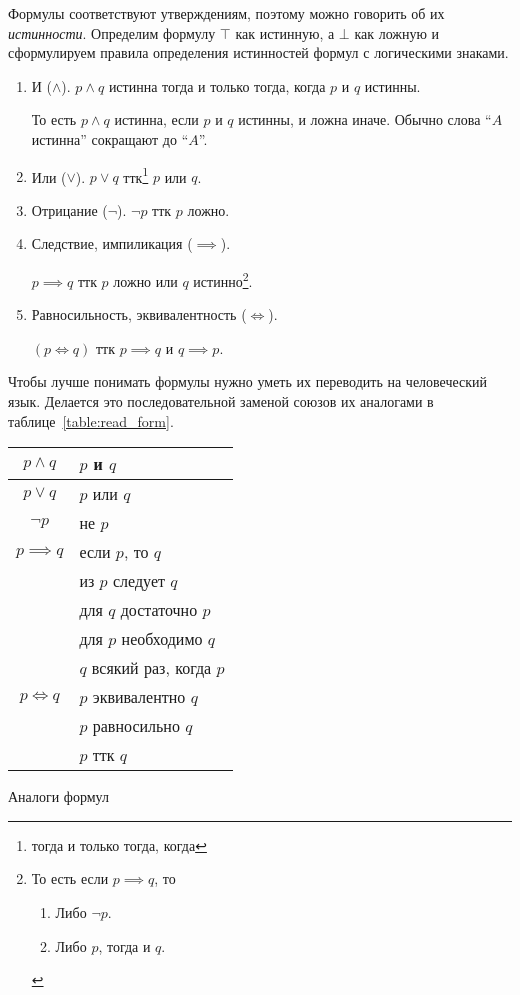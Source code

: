Формулы соответствуют утверждениям, поэтому можно говорить об их {\it истинности}.
Определим формулу $\top$ как истинную, а $\bot$ как ложную и
сформулируем правила определения истинностей формул с логическими знаками.
\begin{enumerate}
	\item{}И ($\land$). $p\land q$ истинна тогда и только тогда, когда $p$ и $q$ истинны.

	То есть $p\land q$ истинна, если $p$ и $q$ истинны,
	и ложна иначе. Обычно слова ``$A$ истинна'' сокращают до ``$A$''.

	\item{}Или ($\lor$). $p\lor q$ ттк\footnote{тогда и только тогда, когда} $p$ или $q$.

	\item{}Отрицание ($\lnot$). $\lnot p$ ттк $p$ ложно.

	\item{}Следствие, импиликация ($\implies$).

	$p\implies q$ ттк $p$ ложно или $q$ истинно\footnote{
		То есть если $p\implies q$, то
		\begin{enumerate}
			\item{}Либо $\lnot p$.
			\item{}Либо $p$, тогда и $q$.
		\end{enumerate}
	}.

	\item{}Равносильность, эквивалентность ($\iff$).

	$(p\iff q)$ ттк $p\implies q$ и $q\implies p$.
\end{enumerate}

Чтобы лучше понимать формулы нужно уметь их переводить на человеческий язык. Делается
это последовательной заменой союзов их аналогами в таблице~\ref{table:read_form}.
\begin{margintable}
	\begin{tabular}{cl}
		$p\land q$    & $p$ и $q$                 \\\hline
		$p\lor q$     & $p$ или $q$               \\\hline
		$\lnot p$     & не $p$                    \\\hline
		$p\implies q$ & если $p$, то $q$          \\
		              & из $p$ следует $q$        \\
		              & для $q$ достаточно $p$    \\
		              & для $p$ необходимо $q$    \\
		              & $q$ всякий раз, когда $p$ \\\hline
		$p\iff q$     & $p$ эквивалентно $q$      \\
		              & $p$ равносильно $q$       \\
		              & $p$ ттк $q$
	\end{tabular}
	\caption{Аналоги формул}\label{table:read_form}
\end{margintable}

